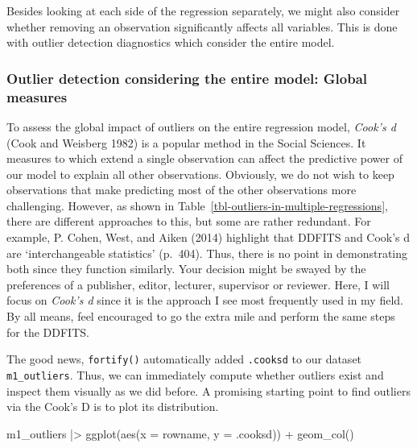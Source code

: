 \documentclass[
  letterpaper,
  DIV=11,
  numbers=noendperiod]{scrreprt}
\newenvironment{Shaded}{\begin{snugshade}}{\end{snugshade}}
\newcommand{\AttributeTok}[1]{\textcolor[rgb]{0.40,0.45,0.13}{#1}}
\newcommand{\FunctionTok}[1]{\textcolor[rgb]{0.28,0.35,0.67}{#1}}
\newcommand{\NormalTok}[1]{\textcolor[rgb]{0.00,0.23,0.31}{#1}}
\newcommand{\SpecialCharTok}[1]{\textcolor[rgb]{0.37,0.37,0.37}{#1}}
\begin{document}
Besides looking at each side of the regression separately, we might also
consider whether removing an observation significantly affects all
variables. This is done with outlier detection diagnostics which
consider the entire model.

\subsubsection{Outlier detection considering the entire model: Global
measures}\label{sec-outlier-detection-global-measures}

To assess the global impact of outliers on the entire regression model,
\emph{Cook's d} (Cook and Weisberg 1982) is a popular method in the
Social Sciences. It measures to which extend a single observation can
affect the predictive power of our model to explain all other
observations. Obviously, we do not wish to keep observations that make
predicting most of the other observations more challenging. However, as
shown in Table~\ref{tbl-outliers-in-multiple-regressions}, there are
different approaches to this, but some are rather redundant. For
example, P. Cohen, West, and Aiken (2014) highlight that DDFITS and
Cook's d are `interchangeable statistics' (p.~404). Thus, there is no
point in demonstrating both since they function similarly. Your decision
might be swayed by the preferences of a publisher, editor, lecturer,
supervisor or reviewer. Here, I will focus on \emph{Cook's d} since it
is the approach I see most frequently used in my field. By all means,
feel encouraged to go the extra mile and perform the same steps for the
DDFITS.

The good news, \texttt{fortify()} automatically added \texttt{.cooksd}
to our dataset \texttt{m1\_outliers}. Thus, we can immediately compute
whether outliers exist and inspect them visually as we did before. A
promising starting point to find outliers via the Cook's D is to plot
its distribution.

\begin{Shaded}
\begin{Highlighting}[]
\NormalTok{m1\_outliers }\SpecialCharTok{|\textgreater{}}
  \FunctionTok{ggplot}\NormalTok{(}\FunctionTok{aes}\NormalTok{(}\AttributeTok{x =}\NormalTok{ rowname,}
             \AttributeTok{y =}\NormalTok{ .cooksd)) }\SpecialCharTok{+}
  \FunctionTok{geom\_col}\NormalTok{()}
\end{Highlighting}
\end{Shaded}
\end{document}
